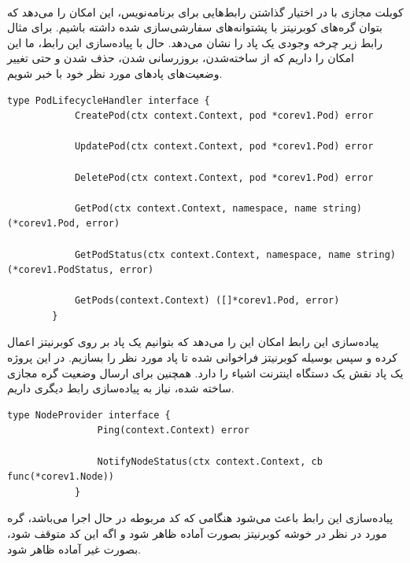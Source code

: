 \paragraph{}
{
    کوبلت مجازی با در اختیار گذاشتن رابط‌هایی برای برنامه‌نویس، این امکان را می‌دهد که بتوان گره‌های کوبرنیتز با پشتوانه‌های
    سفارشی‌سازی شده داشته باشیم. برای مثال رابط زیر چرخه وجودی یک پاد را نشان می‌دهد. حال با پیاده‌سازی این رابط، ما این امکان
    را داریم که از ساخته‌شدن، بروزرسانی شدن، حذف شدن و حتی تغییر وضعیت‌های پاد‌های مورد نظر خود با خبر شویم.
    \newpage
    \begin{latin}
    \begin{lstlisting}[caption=پاد وجودی چرخه کنترل‌کننده رابط]
        type PodLifecycleHandler interface {
            CreatePod(ctx context.Context, pod *corev1.Pod) error
        
            UpdatePod(ctx context.Context, pod *corev1.Pod) error
        
            DeletePod(ctx context.Context, pod *corev1.Pod) error
        
            GetPod(ctx context.Context, namespace, name string) (*corev1.Pod, error)
        
            GetPodStatus(ctx context.Context, namespace, name string) (*corev1.PodStatus, error)
        
            GetPods(context.Context) ([]*corev1.Pod, error)
        }        
    \end{lstlisting}
    \end{latin}

    پیاده‌سازی این رابط امکان این را می‌دهد که بتوانیم یک پاد بر روی کوبرنیتز اعمال کرده و سپس بوسیله کوبرنیتز فراخوانی شده تا پاد مورد نظر را بسازیم. در  این پروژه یک پاد نقش یک دستگاه اینترنت اشیاء را دارد.
    همچنین برای ارسال وضعیت گره مجازی ساخته شده، نیاز به پیاده‌سازی رابط دیگری داریم.

    \begin{latin}
        \begin{lstlisting}[caption={گره وضعیت کنترل‌کننده رابط}]
            type NodeProvider interface {
                Ping(context.Context) error

                NotifyNodeStatus(ctx context.Context, cb func(*corev1.Node))
            }

        \end{lstlisting}
    \end{latin}

    پیاده‌سازی این رابط باعث می‌شود هنگامی که کد مربوطه در حال اجرا می‌باشد، گره مورد در نظر در خوشه کوبرنیتز بصورت آماده ظاهر شود و اگه این کد متوقف شود، بصورت غیر آماده ظاهر شود.
}

